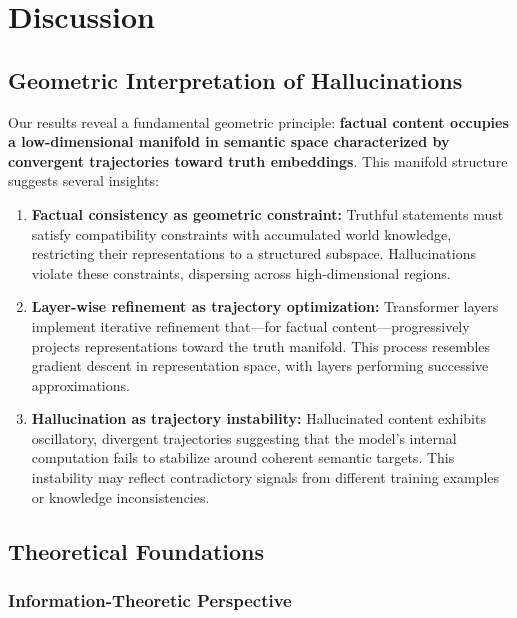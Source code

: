 \documentclass[11pt]{article}
\begin{document}
\section{Discussion}
\label{sec:discussion}

\subsection{Geometric Interpretation of Hallucinations}

Our results reveal a fundamental geometric principle: \textbf{factual content occupies a low-dimensional manifold in semantic space characterized by convergent trajectories toward truth embeddings}. This manifold structure suggests several insights:

\begin{enumerate}[leftmargin=*]
    \item \textbf{Factual consistency as geometric constraint:} Truthful statements must satisfy compatibility constraints with accumulated world knowledge, restricting their representations to a structured subspace. Hallucinations violate these constraints, dispersing across high-dimensional regions.
    
    \item \textbf{Layer-wise refinement as trajectory optimization:} Transformer layers implement iterative refinement that—for factual content—progressively projects representations toward the truth manifold. This process resembles gradient descent in representation space, with layers performing successive approximations.
    
    \item \textbf{Hallucination as trajectory instability:} Hallucinated content exhibits oscillatory, divergent trajectories suggesting that the model's internal computation fails to stabilize around coherent semantic targets. This instability may reflect contradictory signals from different training examples or knowledge inconsistencies.
\end{enumerate}

\subsection{Theoretical Foundations}

\subsubsection{Information-Theoretic Perspective}
\end{document}

